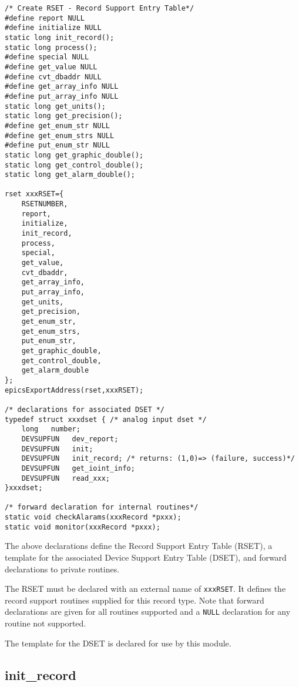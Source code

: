 \begin{verbatim}
/* Create RSET - Record Support Entry Table*/
#define report NULL
#define initialize NULL
static long init_record();
static long process();
#define special NULL
#define get_value NULL
#define cvt_dbaddr NULL
#define get_array_info NULL
#define put_array_info NULL
static long get_units();
static long get_precision();
#define get_enum_str NULL
#define get_enum_strs NULL
#define put_enum_str NULL
static long get_graphic_double();
static long get_control_double();
static long get_alarm_double();

rset xxxRSET={
    RSETNUMBER,
    report,
    initialize,
    init_record,
    process,
    special,
    get_value,
    cvt_dbaddr,
    get_array_info,
    put_array_info,
    get_units,
    get_precision,
    get_enum_str,
    get_enum_strs,
    put_enum_str,
    get_graphic_double,
    get_control_double,
    get_alarm_double
};
epicsExportAddress(rset,xxxRSET);

/* declarations for associated DSET */
typedef struct xxxdset { /* analog input dset */
    long   number;
    DEVSUPFUN   dev_report;
    DEVSUPFUN   init;
    DEVSUPFUN   init_record; /* returns: (1,0)=> (failure, success)*/
    DEVSUPFUN   get_ioint_info;
    DEVSUPFUN   read_xxx;
}xxxdset;

/* forward declaration for internal routines*/
static void checkAlarams(xxxRecord *pxxx);
static void monitor(xxxRecord *pxxx);
\end{verbatim}The above declarations define the Record Support Entry Table (RSET), a template for the associated Device Support 
Entry Table (DSET), and forward declarations to private routines.

The RSET must be declared with an external name of \verb|xxxRSET|. It defines the record support routines supplied for this 
record type. Note that forward declarations are given for all routines supported and a \verb|NULL| declaration for any routine not 
supported.

The template for the DSET is declared for use by this module. 

\subsection{init\_record}

